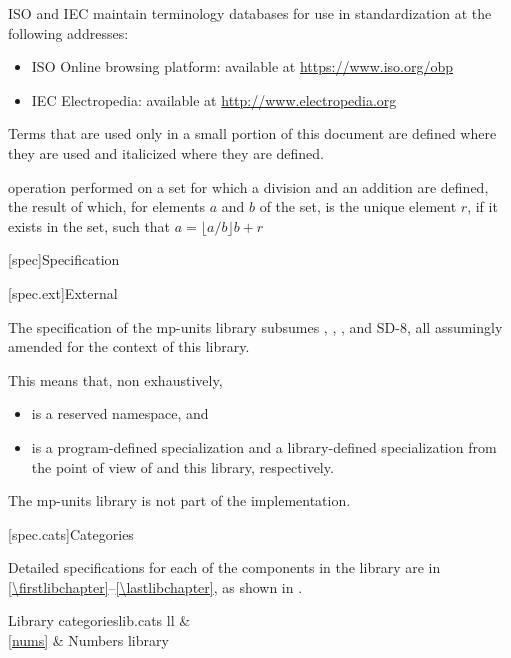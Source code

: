 \pnum
ISO and IEC maintain terminology databases
for use in standardization
at the following addresses:
\begin{itemize}
\item ISO Online browsing platform: available at \url{https://www.iso.org/obp}
\item IEC Electropedia: available at \url{http://www.electropedia.org}
\end{itemize}

\pnum
Terms that are used only in a small portion of this document
are defined where they are used and italicized where they are defined.

%
operation performed on a set for which a division and an addition are defined,
the result of which, for elements $a$ and $b$ of the set,
is the unique element $r$, if it exists in the set,
such that $a = \lfloor a/b \rfloor b + r$


[spec]{Specification}

[spec.ext]{External}

\pnum
The specification of the mp-units library subsumes
, , , and SD-8,
all assumingly amended for the context of this library.
\begin{note}
This means that, non exhaustively,
\begin{itemize}
\item {} is a reserved namespace, and
\item
{}
is a program-defined specialization and a library-defined specialization
from the point of view of \Cpp{} and this library, respectively.
\end{itemize}
\end{note}

\pnum
The mp-units library is not part of the \Cpp{} implementation.

[spec.cats]{Categories}

\pnum
Detailed specifications for each of the components in the library are in
\ref{\firstlibchapter}--\ref{\lastlibchapter},
as shown in .

\begin{floattable}{Library categories}{lib.cats}
{ll}
\topline
{}        &                               \\ \capsep
\ref{nums}              & Numbers library                                 \\
\end{floattable}

